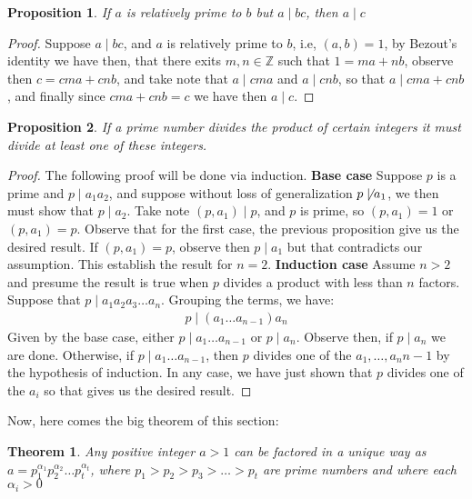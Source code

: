 \documentclass[11pt,a4paper]{article}
\newtheorem{thm}{Theorem}
\newtheorem{claim}{Proposition}
\begin{document}
\begin{claim}
	If $a$ is relatively prime to $b$ but $ a \mid bc$, then $a\mid c$
\end{claim} 
\begin{proof}
	Suppose $a \mid bc$, and $a$ is relatively prime to $b$, i.e, $(a,b) = 1 $, by Bezout's identity we have then, that there exits $m,n \in \mathbb{Z} $ such that $ 1 = ma + nb$, observe then $ c = cma + cnb $, and take note that $ a \mid cma $ and $ a \mid cnb $, so that $ a \mid cma + cnb $, and finally since $ cma + cnb = c$ we have then $ a \mid c$.
\end{proof}
\begin{claim}
	If a prime number divides the product of certain integers it must divide at least one of these integers.
\end{claim}
\begin{proof}
	The following proof will be done via induction. \newline
	\textbf{Base case} Suppose $p$ is a prime and $p \mid a_1a_2 $, and suppose without loss of generalization $p \not\mid a_1$, we then must show that $ p \mid a_2$. Take note $(p,a_1) \mid p$, and $p$ is prime, so $(p,a_1) = 1$ or $(p,a_1) = p$. Observe that for the first case, the previous proposition give us the desired result. If $(p,a_1) = p$, observe then $p \mid a_1$ but that contradicts our assumption. This establish the result for $n = 2$. \newline
	\textbf{Induction case} Assume $n > 2$ and presume the result is true when $p$ divides a product with less than $n$ factors. Suppose that $ p \mid a_1 a_2 a_3 \ldots a_n$. Grouping the terms, we have:
	\begin{align*}
	p \mid (a_1 \ldots a_{n-1}) a_n
	\end{align*} 
	Given by the base case, either $ p \mid a_1 \ldots a_{n-1} $ or $ p \mid a_n$. Observe then, if $ p \mid a_n$ we are done. Otherwise, if $ p \mid a_1 \ldots a_{n-1} $, then $p$ divides one of the $ a_1, \ldots, a_n{n-1} $ by the hypothesis of induction. In any case, we have just shown that $p$ divides one of the $a_i$ so that gives us the desired result.
\end{proof}
Now, here comes the big theorem of this section:
\begin{thm}
	Any positive integer $ a > 1$ can be factored in a unique way as $ a = p_1^{\alpha_1}p_2^{\alpha_2} \dots p_t^{\alpha_t}$, where $p_1 > p_2 > p_3 > \ldots > p_t $ are prime numbers and where each $ \alpha_i > 0 $
\end{thm}
\end{document}
